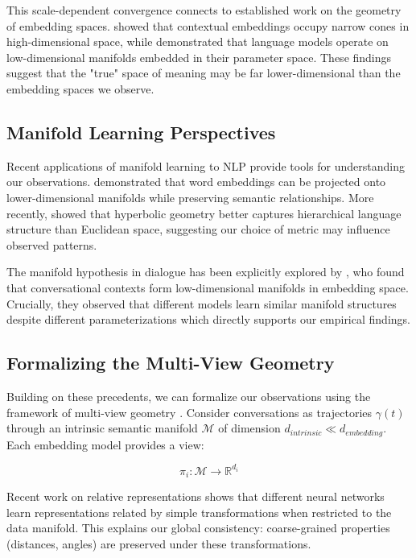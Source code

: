 \documentclass[11pt,letterpaper]{article}
\begin{document}
This scale-dependent convergence connects to established work on the geometry of embedding spaces. \citet{ethayarajh2019contextual} showed that contextual embeddings occupy narrow cones in high-dimensional space, while \citet{aghajanyan2021intrinsic} demonstrated that language models operate on low-dimensional manifolds embedded in their parameter space. These findings suggest that the "true" space of meaning may be far lower-dimensional than the embedding spaces we observe.

\subsection{Manifold Learning Perspectives}

Recent applications of manifold learning to NLP provide tools for understanding our observations. \citet{hasan2017manifold} demonstrated that word embeddings can be projected onto lower-dimensional manifolds while preserving semantic relationships. More recently, \citet{chen2024hypformer} showed that hyperbolic geometry better captures hierarchical language structure than Euclidean space, suggesting our choice of metric may influence observed patterns.

The manifold hypothesis in dialogue has been explicitly explored by \citet{ruppik2024topology}, who found that conversational contexts form low-dimensional manifolds in embedding space. Crucially, they observed that different models learn similar manifold structures despite different parameterizations which directly supports our empirical findings.

\subsection{Formalizing the Multi-View Geometry}

Building on these precedents, we can formalize our observations using the framework of multi-view geometry \citep{moschella2023unified}. Consider conversations as trajectories $\gamma(t)$ through an intrinsic semantic manifold $\mathcal{M}$ of dimension $d_{intrinsic} \ll d_{embedding}$. Each embedding model provides a view:

$$\pi_i: \mathcal{M} \to \mathbb{R}^{d_i}$$

Recent work on relative representations \citep{moschella2023unified} shows that different neural networks learn representations related by simple transformations when restricted to the data manifold. This explains our global consistency: coarse-grained properties (distances, angles) are preserved under these transformations.
\end{document}
